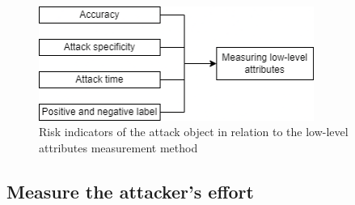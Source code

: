 \begin{figure}[ht!]
  \centering
  \includegraphics[width=9cm]{pictures/measure_damage.png}
  \caption{Risk indicators of the attack object in relation to the low-level attributes measurement method}
  \label{fig:measure_damage}
\end{figure}

\subsection{Measure the attacker's effort}
\label{sec:find_effort}

